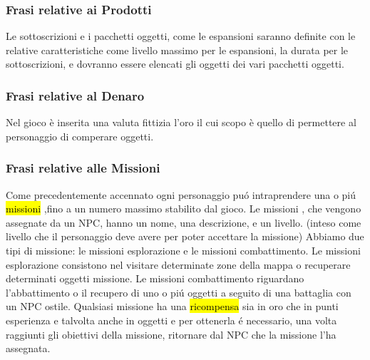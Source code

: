 \subsubsection{Frasi relative ai Prodotti}

Le sottoscrizioni e i pacchetti oggetti, come le espansioni saranno definite con le relative caratteristiche come livello massimo per le espansioni, la durata per le sottoscrizioni, e dovranno essere elencati gli oggetti dei vari pacchetti oggetti.\\


\subsubsection{Frasi relative al Denaro}

Nel gioco è inserita una valuta fittizia l'oro il cui scopo è quello di permettere al personaggio di comperare oggetti.\\

\subsubsection{Frasi relative alle Missioni}

Come precedentemente accennato ogni personaggio pu\'{o} intraprendere una o pi\'{u} \hl{missioni} ,fino a un numero massimo stabilito dal gioco.
Le missioni , che vengono assegnate da un NPC, hanno un nome, una descrizione, e un livello. (inteso come livello che il personaggio deve avere per poter accettare la missione)
Abbiamo due tipi di missione: le missioni esplorazione e  le missioni combattimento. Le missioni esplorazione  consistono nel visitare determinate zone della mappa o recuperare determinati oggetti missione. Le missioni  combattimento riguardano l'abbattimento o il recupero di uno o pi\'{u} oggetti a seguito di una battaglia con un NPC ostile.
Qualsiasi  missione ha una \hl{ricompensa} sia in oro che in punti esperienza e talvolta anche in oggetti e per ottenerla \'{e} necessario, una volta raggiunti gli obiettivi della missione, ritornare dal NPC che la missione l'ha assegnata.\\

